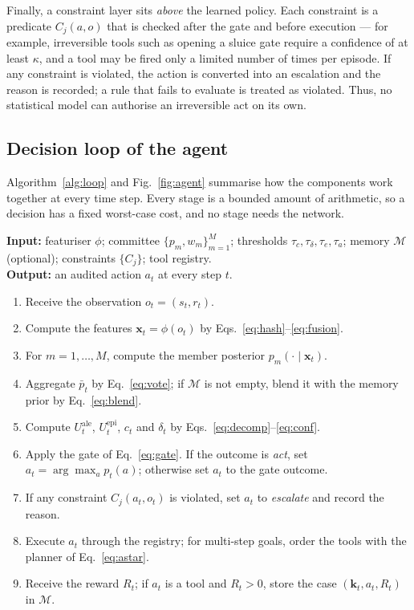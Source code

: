 \documentclass[journal]{IEEEtran}
\begin{document}
Finally, a constraint layer sits \emph{above} the learned policy. Each
constraint is a predicate $C_j(a,o)$ that is checked after the gate and before
execution --- for example, irreversible tools such as opening a sluice gate
require a confidence of at least $\kappa$, and a tool may be fired only a limited
number of times per episode. If any constraint is violated, the action is
converted into an escalation and the reason is recorded; a rule that fails to
evaluate is treated as violated. Thus, no statistical model can authorise an
irreversible act on its own.

\subsection{Decision loop of the agent}\label{sec:loop}
Algorithm~\ref{alg:loop} and Fig.~\ref{fig:agent} summarise how the
components work together at every time step. Every stage is a bounded amount
of arithmetic, so a decision has a fixed worst-case cost, and no stage needs
the network.

\begin{algorithm}[t]
\caption{Decision loop of a CONCLAVE agent}
\label{alg:loop}
\small
\textbf{Input:} featuriser $\phi$; committee $\{p_m,w_m\}_{m=1}^{M}$;
thresholds $\tau_c,\tau_\delta,\tau_e,\tau_a$; memory $\mathcal{M}$ (optional);
constraints $\{C_j\}$; tool registry.\\
\textbf{Output:} an audited action $a_t$ at every step $t$.
\begin{enumerate}
\item Receive the observation $o_t=(s_t,r_t)$.
\item Compute the features $\mathbf{x}_t=\phi(o_t)$ by Eqs.~\eqref{eq:hash}--\eqref{eq:fusion}.
\item For $m=1,\dots,M$, compute the member posterior $p_m(\cdot\mid\mathbf{x}_t)$.
\item Aggregate $\bar{p}_t$ by Eq.~\eqref{eq:vote}; if $\mathcal{M}$ is not
      empty, blend it with the memory prior by Eq.~\eqref{eq:blend}.
\item Compute $U^{\mathrm{ale}}_t$, $U^{\mathrm{epi}}_t$, $c_t$ and $\delta_t$ by
      Eqs.~\eqref{eq:decomp}--\eqref{eq:conf}.
\item Apply the gate of Eq.~\eqref{eq:gate}. If the outcome is \emph{act}, set
      $a_t=\arg\max_a p_t(a)$; otherwise set $a_t$ to the gate outcome.
\item If any constraint $C_j(a_t,o_t)$ is violated, set $a_t$ to
      \emph{escalate} and record the reason.
\item Execute $a_t$ through the registry; for multi-step goals, order the
      tools with the planner of Eq.~\eqref{eq:astar}.
\item Receive the reward $R_t$; if $a_t$ is a tool and $R_t>0$, store the case
      $(\mathbf{k}_t,a_t,R_t)$ in $\mathcal{M}$.
\end{enumerate}
\end{algorithm}
\end{document}
